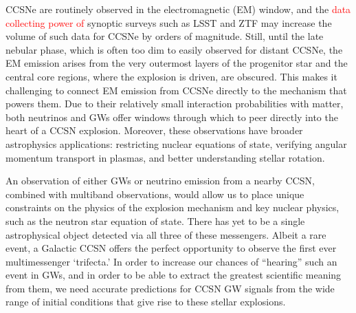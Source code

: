 \documentclass[twocolumn,times]{aastex62}  %
\begin{document}
CCSNe are routinely observed in the electromagnetic (EM) window, and the \textcolor{red}{data collecting power of} synoptic surveys such as LSST and ZTF may increase the volume of such data for CCSNe by orders of magnitude.
Still, until the late nebular phase, which is often too dim to easily observed for distant CCSNe, the EM emission arises from the very outermost layers of the progenitor star and the central core regions, where the explosion is driven, are obscured. 
This makes it challenging to connect EM emission from CCSNe directly to the mechanism that powers them.
Due to their relatively small interaction probabilities with matter, both neutrinos and GWs offer windows through which to peer directly into the heart of a CCSN explosion.  
Moreover, these observations have broader astrophysics applications: restricting nuclear equations of state, verifying angular momentum transport in plasmas, and better understanding stellar rotation.

An observation of either GWs or neutrino emission from a nearby CCSN, combined with multiband observations, would allow us to place unique constraints on the physics of the explosion mechanism and key nuclear physics, such as the neutron star equation of state.  
There has yet to be a single astrophysical object detected via all three of these messengers.  
Albeit a rare event, a Galactic CCSN offers the perfect opportunity to observe the first ever multimessenger `trifecta.'  
In order to increase our chances of ``hearing'' such an event in GWs, and in order to be able to extract the greatest scientific meaning from them, we need accurate predictions for CCSN GW signals from the wide range of initial conditions that give rise to these stellar explosions.
\end{document}
